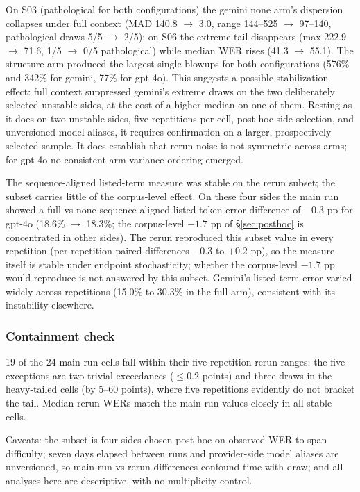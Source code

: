 \documentclass[11pt]{article}
\begin{document}
On S03 (pathological for both configurations) the gemini none arm's dispersion collapses under full context (MAD 140.8 $\rightarrow$ 3.0, range 144--525 $\rightarrow$ 97--140, pathological draws 5/5 $\rightarrow$ 2/5); on S06 the extreme tail disappears (max 222.9 $\rightarrow$ 71.6, 1/5 $\rightarrow$ 0/5 pathological) while median WER rises (41.3 $\rightarrow$ 55.1). The structure arm produced the largest single blowups for both configurations (576\% and 342\% for gemini, 77\% for gpt-4o). This suggests a possible stabilization effect: full context suppressed gemini's extreme draws on the two deliberately selected unstable sides, at the cost of a higher median on one of them. Resting as it does on two unstable sides, five repetitions per cell, post-hoc side selection, and unversioned model aliases, it requires confirmation on a larger, prospectively selected sample. It does establish that rerun noise is not symmetric across arms; for gpt-4o no consistent arm-variance ordering emerged.

The sequence-aligned listed-term measure was stable on the rerun subset; the subset carries little of the corpus-level effect. On these four sides the main run showed a full-vs-none sequence-aligned listed-token error difference of $-0.3$ pp for gpt-4o (18.6\% $\rightarrow$ 18.3\%; the corpus-level $-1.7$ pp of \S\ref{sec:posthoc} is concentrated in other sides). The rerun reproduced this subset value in every repetition (per-repetition paired differences $-0.3$ to $+0.2$ pp), so the measure itself is stable under endpoint stochasticity; whether the corpus-level $-1.7$ pp would reproduce is not answered by this subset. Gemini's listed-term error varied widely across repetitions (15.0\% to 30.3\% in the full arm), consistent with its instability elsewhere.

\subsubsection*{Containment check}

19 of the 24 main-run cells fall within their five-repetition rerun ranges; the five exceptions are two trivial exceedances ($\le 0.2$ points) and three draws in the heavy-tailed cells (by 5--60 points), where five repetitions evidently do not bracket the tail. Median rerun WERs match the main-run values closely in all stable cells.

Caveats: the subset is four sides chosen post hoc on observed WER to span difficulty; seven days elapsed between runs and provider-side model aliases are unversioned, so main-run-vs-rerun differences confound time with draw; and all analyses here are descriptive, with no multiplicity control.
\end{document}
